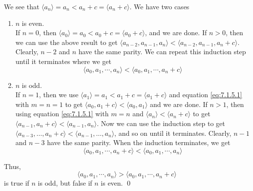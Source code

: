 \documentclass[12 pt]{amsart}
\begin{document}
  We see that 
  $\langle a_n \rangle = a_n < a_n + c = \langle a_n + c \rangle$.
  We have two cases
  \begin{enumerate}
  \item $n$ is even. \\
    If $n = 0$, then 
    $\langle a_0 \rangle = a_0 < a_0 + c = \langle a_0 + c \rangle$,
    and we are done.
    If $n > 0$, then we can use the above result to get
    $\langle a_{n-2}, a_{n-1}, a_n \rangle 
    < \langle a_{n-2}, a_{n-1}, a_n + c \rangle$.
    Clearly, $n - 2$ and $n$ have the same parity.
    We can repeat this induction step until it terminates
    where we get
    \[
      \langle a_0, a_1, \cdots, a_n \rangle 
      < 
      \langle a_0, a_1, \cdots, a_n + c \rangle 
    \]
  \item $n$ is odd. \\
    If $n = 1$, then we use 
    $\langle a_1 \rangle = a_1 < a_1 + c = \langle a_1 + c \rangle$
    and equation \ref{eq:7.1.5.1} with $m = n = 1$ to get
    $\langle a_0, a_1 + c \rangle < \langle a_0, a_1 \rangle$ and 
    we are done.
    If $n > 1$, then using equation \ref{eq:7.1.5.1} with 
    $m = n$ and $\langle a_n \rangle < \langle a_n + c \rangle$
    to get
    $\langle a_{n-1}, a_n + c\rangle < \langle a_{n-1}, a_n \rangle$.
    Now we can use the induction step to get
    $\langle a_{n-3}, \ldots, a_n + c\rangle 
    < \langle a_{n-1}, \ldots, a_n \rangle$,
    and so on until it terminates. 
    Clearly, $n-1$ and $n-3$ have the same parity.
    When the induction terminates, we get
    \[
      \langle a_0, a_1, \cdots, a_n + c \rangle 
      < 
      \langle a_0, a_1, \cdots, a_n \rangle 
    \]
  \end{enumerate}
  Thus,
  \[
    \langle a_0, a_1, \cdots, a_n \rangle 
    > 
    \langle a_0, a_1, \cdots, a_n + c \rangle 
  \]
  is true if $n$ is odd, but false if $n$ is even.
  \qed
\vfill
\newpage
\end{document}
